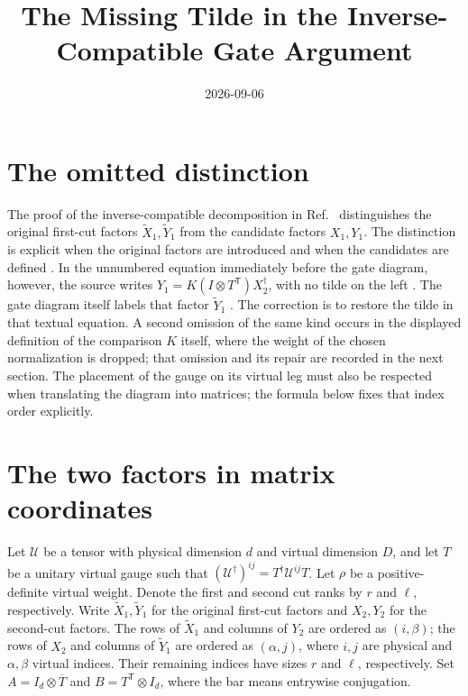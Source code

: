 \documentclass{article}
\title{The Missing Tilde in the Inverse-Compatible Gate Argument}
\author{}
\date{2026-09-06}
\begin{document}
\maketitle
{}

\section{The omitted distinction}

The proof of the inverse-compatible decomposition in
Ref.~\cite[lines~5350--5487]{FrancoRubio2025MPUGauging} distinguishes the original first-cut factors $\widetilde X_1,\widetilde Y_1$ from the candidate factors $X_1,Y_1$. The distinction is explicit when the original factors are introduced and when the candidates are defined
\cite[lines~5391 and 5432--5435]{FrancoRubio2025MPUGauging}. In the unnumbered equation immediately before the gate diagram, however, the source writes
$Y_1=K(I\otimes T^{\mathsf T})X_2^\dagger$, with no tilde on the left
\cite[lines~5440--5443]{FrancoRubio2025MPUGauging}. The gate diagram itself labels that factor $\widetilde Y_1$
\cite[lines~5444--5487]{FrancoRubio2025MPUGauging}.
The correction is to restore the tilde in that textual equation. A second omission of the same kind occurs in the displayed definition of the comparison $K$ itself, where the weight of the chosen normalization is dropped; that omission and its repair are recorded in the next section. The placement of the gauge on its virtual leg must also be respected when translating the diagram into matrices; the formula below fixes that index order explicitly.

\section{The two factors in matrix coordinates}

Let $\mathcal U$ be a tensor with physical dimension $d$ and virtual dimension $D$, and let $T$ be a unitary virtual gauge such that
$(\mathcal U^\dagger)^{ij}=T^\dagger\mathcal U^{ij}T$.
Let $\rho$ be a positive-definite virtual weight. Denote the first and second cut ranks by $r$ and $\ell$, respectively. Write
$\widetilde X_1,\widetilde Y_1$ for the original first-cut factors and $X_2,Y_2$ for the second-cut factors.
The rows of $\widetilde X_1$ and columns of $Y_2$ are ordered as $(i,\beta)$; the rows of $X_2$ and columns of $\widetilde Y_1$ are ordered as $(\alpha,j)$, where $i,j$ are physical and $\alpha,\beta$ virtual indices. Their remaining indices have sizes $r$ and $\ell$, respectively. Set $A=I_d\otimes\overline T$ and $B=T^{\mathsf T}\otimes I_d$, where the bar means entrywise conjugation.
\end{document}
